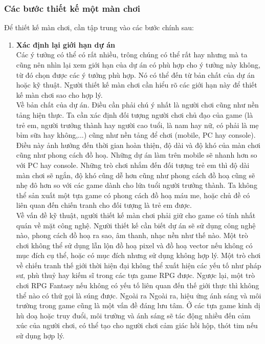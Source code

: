 \subsubsection{Các bước thiết kế một màn chơi}
\hspace*{1cm} Để thiết kế màn chơi, cần tập trung vào các bước chính sau:
\begin{enumerate}
	\item \textbf{Xác định lại giới hạn dự án}\\
	Các ý tưởng có thể có rất nhiều, trông chúng có thể rất hay nhưng mà ta cũng nên nhìn lại xem giới hạn của dự án có phù hợp cho ý tưởng này không, từ đó chọn được các ý tưởng phù hợp. Nó có thể đến từ bản chất của dự án hoặc kỹ thuật. Người thiết kế màn chơi cần hiểu rõ các giới hạn này để thiết kế màn chơi sao cho hợp lý.\\
	\hspace*{1cm} Về bản chất của dự án. Điều cần phải chú ý nhất là người chơi cũng như nền tảng hiện thực. Ta cần xác định đối tượng người chơi chủ đạo của game (là trẻ em, người trưởng thành hay người cao tuổi, là nam hay nữ, có phải là mẹ bỉm sữa hay không,...) cũng như nền tảng để chơi (mobile, PC hay console). Điều này ảnh hưởng đến thời gian hoàn thiện, độ dài và độ khó của màn chơi cũng như phong cách đồ hoạ. Những dự án làm trên mobile sẽ nhanh hơn so với PC hay console. Những trò chơi nhắm đến đối tượng trẻ em thì độ dài màn chơi sẽ ngắn, độ khó cũng dễ hơn cũng như phong cách đồ hoạ cũng sẽ nhẹ đô hơn so với các game dành cho lứa tuổi người trưởng thành. Ta không thể sản xuất một tựa game có phong cách đồ hoạ máu me, hoặc chủ đề có liên quan đến chiến tranh cho đối tượng là trẻ em được.\\
	\hspace*{1cm} Về vấn đề kỹ thuật, người thiết kế màn chơi phải giữ cho game có tính nhất quán về mặt công nghệ. Người thiết kế cần biết dự án sẽ sử dụng công nghệ nào, phong cách đồ hoạ ra sao, âm thanh, nhạc nền như thế nào. Một trò chơi không thể sử dụng lẫn lộn đồ hoạ pixel và đồ hoạ vector nếu không có mục đích cụ thể, hoặc có mục đích nhưng sử dụng không hợp lý. Một trò chơi về chiến tranh thế giới thời hiện đại không thể xuất hiện các yếu tố như pháp sư, phù thuỷ hay kiếm sĩ trong các tựa game RPG được. Ngược lại, một trò chơi RPG Fantasy nếu không có yếu tố liên quan đến thế giới thực thì không thể nào có thứ gọi là súng được. Ngoài ra  Ngoài ra, hiệu ứng ánh sáng và môi trường trong game cũng là một vấn đề đáng lưu tâm. Ở các tựa game kinh dị hù doạ hoặc truy đuổi, môi trường và ánh sáng sẽ tác động nhiều đến cảm xúc của người chơi, có thể tạo cho người chơi cảm giác hồi hộp, thót tim nếu sử dụng hợp lý.\\

\end{enumerate}
